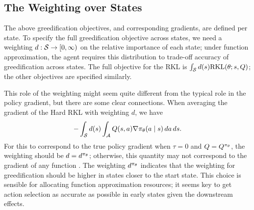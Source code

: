 \documentclass[\main/thesis.tex]{subfiles}
\begin{document}

\subsection{The Weighting over States}

The above greedification objectives, and corresponding gradients, are defined per state. To specify the full greedification objective across states, we need a weighting $d: \mathcal{S} \rightarrow [0, \infty)$ on the relative importance of each state; under function approximation, the agent requires this distribution to trade-off accuracy of greedification across states. The full objective for the RKL is $\int_{\mathcal{S}} d(s) \text{RKL}(\theta; s, {Q})$; the other objectives are specified similarly.  

This role of the weighting might seem quite different from the typical role in the policy gradient, but there are some clear connections. When averaging the gradient of the Hard RKL with weighting $d$, we have 
\begin{align*}
- \int_{\mathcal{S}} d(s)\int_{\mathcal{A}} Q(s,a) \nabla \pi_\theta(a \mid s) \, da\, ds.
\end{align*}
For this to correspond to the true policy gradient when $\tau = 0$ and $Q = Q^{\pi_\theta}$, the weighting should be $d = d^{\pi_\theta}$; otherwise, this quantity may not correspond to the gradient of any function \citep{nota2019policy}. The weighting $d^{\pi_\theta}$ indicates that the weighting for greedification should be higher in states closer to the start state. This choice is sensible for allocating function approximation resources; it seems key to get action selection as accurate as possible in early states given the downstream effects. 
\end{document}
